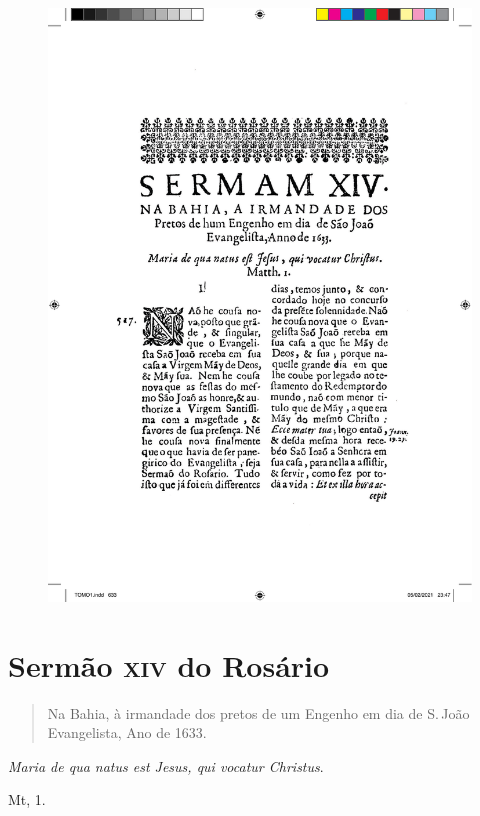 \pagebreak
\thispagestyle{empty}
\movetoevenpage
\begin{figure}
\includegraphics[width=\textwidth]{./imgs/rosa.pdf}  
\end{figure}

\chapter{Sermão \textsc{xiv} do Rosário}

\begin{quotation}
\noindent{}Na Bahia, à irmandade dos pretos de um Engenho
em dia de S.\,João Evangelista, Ano de 1633.
\end{quotation}

\epigraph{\emph{Maria de qua natus est Jesus, qui vocatur Christus}.\footnotemark}{Mt, 1.}

